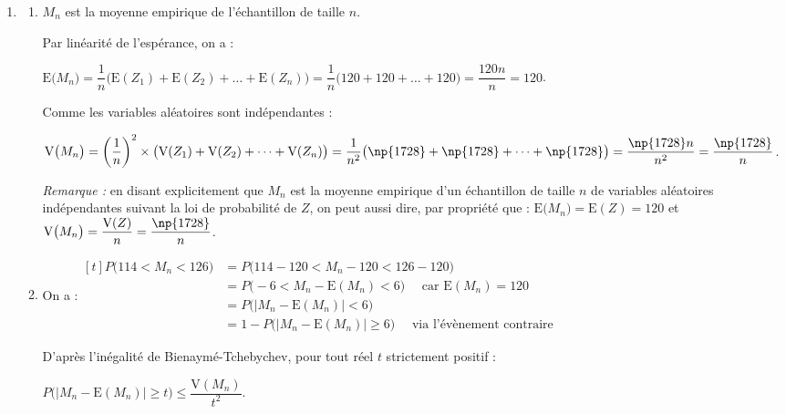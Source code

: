\begin{enumerate}
\begin{enumerate}
			$\mathrm{V}(Z)=0,6^2 \times \mathrm{V}(X + Y) = 0,36\big(\mathrm{V}(X) + \mathrm{V}(Y)\big) = 0,36 \times (\np{3114} + \np{1686}) = 0,36 \times \np{4800} = \np{1728}$.
		\end{enumerate}

		\item \begin{enumerate}
			\item $M_{n}$ est la moyenne empirique de l'échantillon de taille $n$.

			Par linéarité de l'espérance, on a :

			$\mathrm{E}\big(M_{n}\big) = \dfrac{1}{n} \big(\mathrm{E}(Z_1) + \mathrm{E}(Z_2) + \dots + \mathrm{E}(Z_n)\big) = \dfrac{1}{n}\big(120 + 120 + \dots + 120\big) = \dfrac{120n}{n} = 120$.

			Comme les variables aléatoires sont indépendantes :

			$\mathrm{V}\big(M_{n}\big) = \left(\dfrac{1}{n}\right)^2 \times \big(\mathrm{V}(Z_1) + \mathrm{V}(Z_2) + \dots + \mathrm{V}(Z_n)\big) = \dfrac{1}{n^2}\big(\np{1728} + \np{1728} + \dots + \np{1728}\big) = \dfrac{\np{1728}n}{n^2} = \dfrac{\np{1728}}{n}$.

			\emph{Remarque :} en disant explicitement que $M_n$ est la moyenne empirique d'un échantillon de taille $n$ de variables aléatoires indépendantes suivant la loi de probabilité de $Z$, on peut aussi dire, par propriété que :
			\quad
			$\mathrm{E}\big(M_{n}\big) = \mathrm{E}(Z)= 120$ \quad et \quad $\mathrm{V}\big(M_{n}\big) = \dfrac{\mathrm{V}(Z)}{n}= \dfrac{\np{1728}}{n}$.

			\item On a :\quad $\begin{aligned}[t]
				P\big(114 < M_n < 126\big)
					&= P\big(114 - 120 < M_n - 120 < 126 - 120\big) \\
					&= P\big(-6 < M_n - \mathrm{E}(M_n) < 6\big)\quad \text{ car } \mathrm{E}(M_n)= 120\\
					&= P\big(\big|M_n - \mathrm{E}(M_n)\big| < 6\big)\\
					&= 1 - P\big(\big|M_n - \mathrm{E}(M_n)\big| \geqslant 6\big) \quad \text{ via l'évènement contraire}
			\end{aligned}$

			D'après l'inégalité de Bienaymé-Tchebychev, pour tout réel $t$ strictement positif :

			$P\big(\big|M_n - \mathrm{E}(M_n)\big| \geqslant t\big) \leqslant \dfrac{\mathrm{V}(M_n)}{t^2}$.


\end{enumerate}
\end{enumerate}
